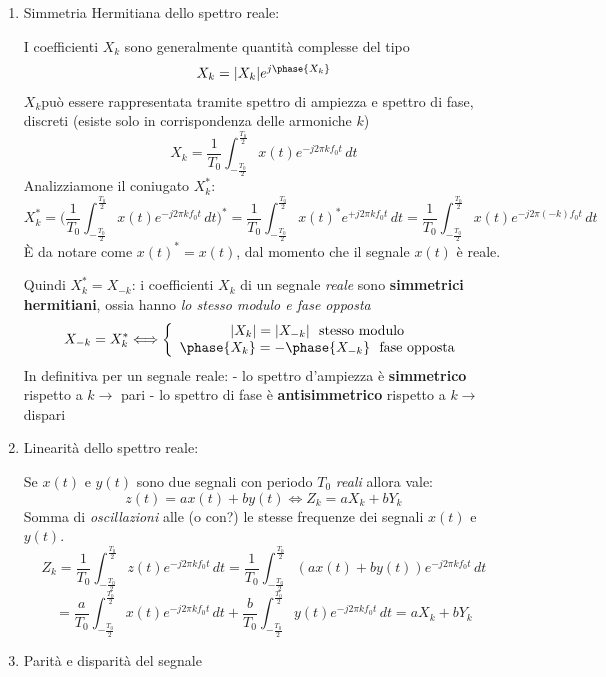 \documentclass[
  paper=a4,
  ,captions=tableheading
]{scrartcl}
\begin{document}
\begin{enumerate}
\def\labelenumi{\arabic{enumi}.}
\setcounter{enumi}{5}
\item
  Simmetria Hermitiana dello spettro reale:

  I coefficienti \(X_k\) sono generalmente quantità complesse del tipo
  \begin{gather*}
   X_k = |X_{k}|e^{j\phase{X_{k}}}
   \end{gather*} \(X_{k}\)può essere rappresentata tramite spettro di
  ampiezza e spettro di fase, discreti (esiste solo in corrispondenza
  delle armoniche \(k\)) \[
   X_k = \frac{1}{T_0} \int_{-\frac{T_0}{2}}^{\frac{T_0}{2}} x(t) e^{-j2\pi kf_{0}t} \,dt
   \] Analizziamone il coniugato \(X^{*}_{k}\): \[
   X_k^{*} = \Big(\frac{1}{T_0} \int_{-\frac{T_0}{2}}^{\frac{T_0}{2}} x(t) e^{-j2\pi kf_{0}t} \,dt \Big)^{*} = \frac{1}{T_0} \int_{-\frac{T_0}{2}}^{\frac{T_0}{2}} x(t)^{*} e^{+j2\pi kf_{0}t} \,dt = \frac{1}{T_0} \int_{-\frac{T_0}{2}}^{\frac{T_0}{2}} x(t) e^{-j2\pi (-k)f_{0}t} \,dt
   \] È da notare come \(x(t)^{*}=x(t)\), dal momento che il segnale
  \(x(t)\) è reale.

  Quindi \(X_{k}^{*}=X_{-k}\): i coefficienti \(X_k\) di un segnale
  \emph{reale} sono \textbf{simmetrici hermitiani}, ossia hanno \emph{lo
  stesso modulo e fase opposta} \[
   X_{-k}=X_{k}^{*} \Longleftrightarrow \left\{ \begin{array}{cl}
   |X_k|=|X_{-k}| \ \text{ stesso modulo}  \\
   \phase{X_{k}} = -\phase{X_{-k}} \ \text{ fase opposta}
   \end{array} \right.
   \] In definitiva per un segnale reale: - lo spettro d'ampiezza è
  \textbf{simmetrico} rispetto a \(k \to\) pari - lo spettro di fase è
  \textbf{antisimmetrico} rispetto a \(k \to\) dispari
\item
  Linearità dello spettro reale:

  Se \(x(t)\) e \(y(t)\) sono due segnali con periodo \(T_0\)
  \emph{reali} allora vale: \[
   z(t)=ax(t)+by(t) \Longleftrightarrow Z_{k} = aX_{k} + bY_{k}
   \] Somma di \emph{oscillazioni} alle (o con?) le stesse frequenze dei
  segnali \(x(t)\) e \(y(t)\). \[
   Z_{k} = \frac{1}{T_0} \int_{-\frac{T_0}{2}}^{\frac{T_0}{2}} z(t) e^{-j2\pi kf_{0}t} \,dt = \frac{1}{T_0} \int_{-\frac{T_0}{2}}^{\frac{T_0}{2}} (ax(t)+by(t)) e^{-j2\pi kf_{0}t} \,dt 
   \] \[
   = \frac{a}{T_0} \int_{-\frac{T_0}{2}}^{\frac{T_0}{2}} x(t) e^{-j2\pi kf_{0}t} \,dt + \frac{b}{T_0} \int_{-\frac{T_0}{2}}^{\frac{T_0}{2}} y(t) e^{-j2\pi kf_{0}t} \,dt = aX_{k}+bY_{k}
   \]
\item
  Parità e disparità del segnale


\end{enumerate}
\end{document}
